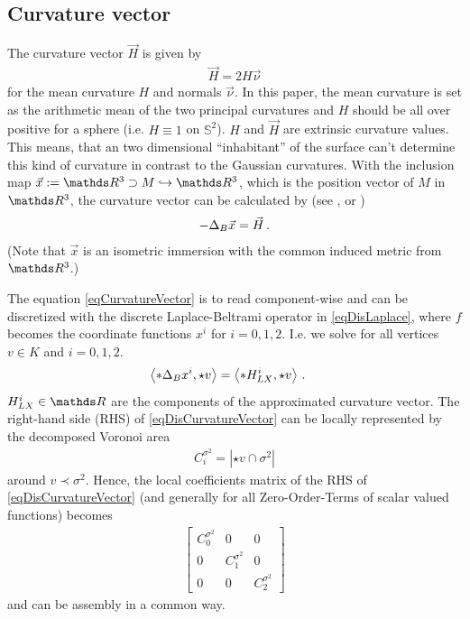   \subsection{Curvature vector} \label{secCurvatureVector}
    The curvature vector \( \vec{H} \) is given by
    \begin{align}\label{eqMeanCurvCurvVec}
      \vec{H} = 2 H \vec{\nu}
    \end{align}
    for the mean curvature \( H \) and normals \( \vec{\nu} \). 
    In this paper, the mean curvature is set as the arithmetic mean of the two principal curvatures and
    \( H \) should be all over positive for a sphere (i.e. \( H\equiv1 \) on \( \mathds{S}^{2} \)).
    \( H \) and \( \vec{H} \) are extrinsic curvature values.
    This means, that an two dimensional ``inhabitant'' of the surface can't determine this kind of curvature 
    in contrast to the Gaussian curvatures.
    With the inclusion map \( \vec{x}:= \R^{3}\supset M \hookrightarrow \R^{3} \), which is the position vector of \( M \) in \( \R^{3} \),
    the curvature vector can be calculated by (see \cite[Ch. 5]{chen}, \cite[Ch. 4.5]{flanders} or \cite{elliott})
    \begin{align} \label{eqCurvatureVector}
      -\Delta_{B}\vec{x} = \vec{H} \,\text{.}
    \end{align}
    (Note that \( \vec{x} \) is an isometric immersion with the common induced metric from \( \R^{3} \).)

    The equation \eqref{eqCurvatureVector} is to read component-wise and can be discretized with 
    the discrete Laplace-Beltrami operator in \eqref{eqDisLaplace}, 
    where \( f \) becomes the  coordinate functions \( x^{i} \) for
    \( i=0,1,2 \).
    I.e. we solve for all vertices \( v\in K \) and \( i=0,1,2 \).
    \begin{align} \label{eqDisCurvatureVector}
      \left\langle *\Delta_{B} x^{i}, \star v \right\rangle
        &= \left\langle *H^{i}_{LX}, \star v \right\rangle \,\text{.}
    \end{align}
    \( H^{i}_{LX}\in \R \) are the components of the approximated curvature vector.
    The right-hand side (RHS) of \eqref{eqDisCurvatureVector} can be locally represented by the decomposed Voronoi area 
    \begin{align}
      C^{\sigma^{2}}_{i} = \left| \star v \cap \sigma^{2}  \right|
    \end{align}
    around \( v\prec\sigma^{2} \).
    Hence, the local coefficients matrix of the RHS of \eqref{eqDisCurvatureVector}
    (and generally for all Zero-Order-Terms of scalar valued functions) becomes
    \begin{align}
      \begin{bmatrix}
        C^{\sigma^{2}}_{0} & 0 & 0 \\
        0 & C^{\sigma^{2}}_{1} & 0 \\
        0 & 0 & C^{\sigma^{2}}_{2}
      \end{bmatrix}
    \end{align}
    and can be assembly in a common way.

